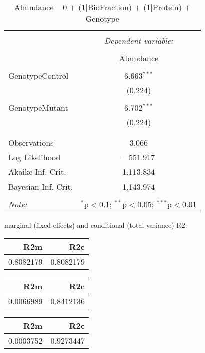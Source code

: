 \documentclass[11pt]{report}
\begin{document}
\begin{table}[!htbp] \centering 
  \caption{Abundance ~ 0 + (1|BioFraction) + (1|Protein) + Genotype} 
  \label{} 
\begin{tabular}{@{\extracolsep{5pt}}lc} 
\\[-1.8ex]\hline 
\hline \\[-1.8ex] 
 & \multicolumn{1}{c}{\textit{Dependent variable:}} \\ 
\cline{2-2} 
\\[-1.8ex] & Abundance \\ 
\hline \\[-1.8ex] 
 GenotypeControl & 6.663$^{***}$ \\ 
  & (0.224) \\ 
  & \\ 
 GenotypeMutant & 6.702$^{***}$ \\ 
  & (0.224) \\ 
  & \\ 
\hline \\[-1.8ex] 
Observations & 3,066 \\ 
Log Likelihood & $-$551.917 \\ 
Akaike Inf. Crit. & 1,113.834 \\ 
Bayesian Inf. Crit. & 1,143.974 \\ 
\hline 
\hline \\[-1.8ex] 
\textit{Note:}  & \multicolumn{1}{r}{$^{*}$p$<$0.1; $^{**}$p$<$0.05; $^{***}$p$<$0.01} \\ 
\end{tabular} 
\end{table} 
marginal (fixed effects) and conditional (total variance) R2:

\begin{tabular}{r|r}
\hline
R2m & R2c\\
\hline
0.8082179 & 0.8082179\\
\hline
\end{tabular}

\begin{tabular}{r|r}
\hline
R2m & R2c\\
\hline
0.0066989 & 0.8412136\\
\hline
\end{tabular}

\begin{tabular}{r|r}
\hline
R2m & R2c\\
\hline
0.0003752 & 0.9273447\\
\hline
\end{tabular}
\end{document}
